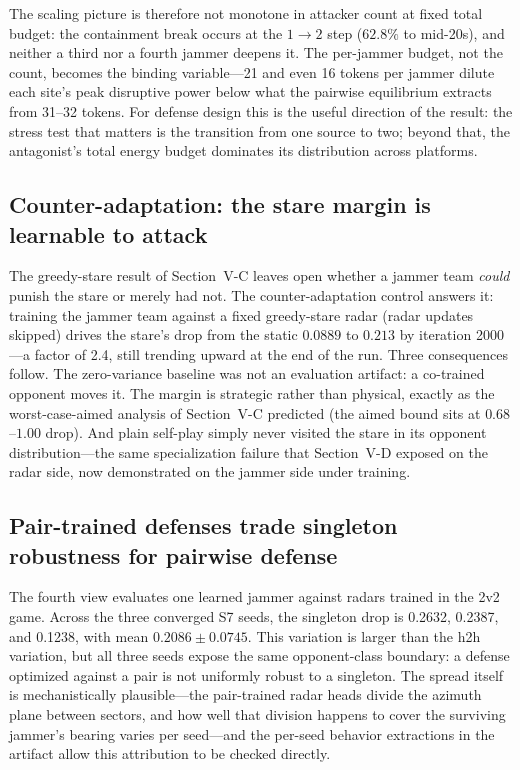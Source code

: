 The scaling picture is therefore not monotone in attacker count at fixed total budget: the containment break occurs at the $1\to2$ step ($62.8\%$ to mid-20s), and neither a third nor a fourth jammer deepens it. The per-jammer budget, not the count, becomes the binding variable---21 and even 16 tokens per jammer dilute each site's peak disruptive power below what the pairwise equilibrium extracts from 31--32 tokens. For defense design this is the useful direction of the result: the stress test that matters is the transition from one source to two; beyond that, the antagonist's total energy budget dominates its distribution across platforms.

\subsection{Counter-adaptation: the stare margin is learnable to attack}
The greedy-stare result of Section~V-C leaves open whether a jammer team \emph{could} punish the stare or merely had not. The counter-adaptation control answers it: training the jammer team against a fixed greedy-stare radar (radar updates skipped) drives the stare's drop from the static $0.0889$ to $0.213$ by iteration 2000---a factor of 2.4, still trending upward at the end of the run. Three consequences follow. The zero-variance baseline was not an evaluation artifact: a co-trained opponent moves it. The margin is strategic rather than physical, exactly as the worst-case-aimed analysis of Section~V-C predicted (the aimed bound sits at $0.68$--$1.00$ drop). And plain self-play simply never visited the stare in its opponent distribution---the same specialization failure that Section~V-D exposed on the radar side, now demonstrated on the jammer side under training.

\subsection{Pair-trained defenses trade singleton robustness for pairwise defense}
The fourth view evaluates one learned jammer against radars trained in the 2v2 game. Across the three converged S7 seeds, the singleton drop is 0.2632, 0.2387, and 0.1238, with mean $0.2086\pm0.0745$. This variation is larger than the h2h variation, but all three seeds expose the same opponent-class boundary: a defense optimized against a pair is not uniformly robust to a singleton. The spread itself is mechanistically plausible---the pair-trained radar heads divide the azimuth plane between sectors, and how well that division happens to cover the surviving jammer's bearing varies per seed---and the per-seed behavior extractions in the artifact allow this attribution to be checked directly.

